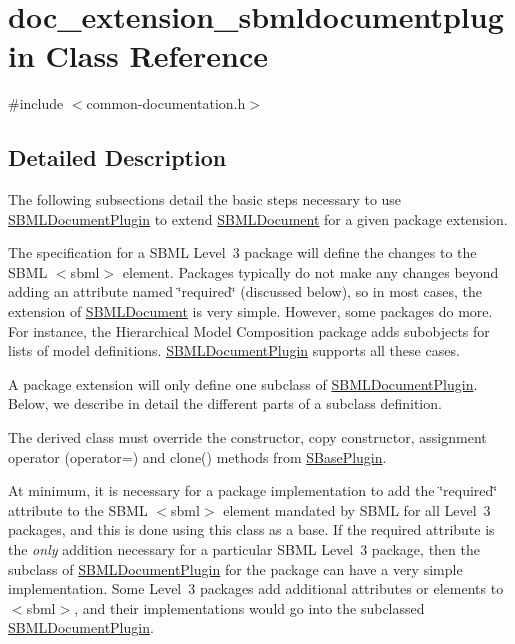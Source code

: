 \hypertarget{classdoc__extension__sbmldocumentplugin}{}\section{doc\+\_\+extension\+\_\+sbmldocumentplugin Class Reference}
\label{classdoc__extension__sbmldocumentplugin}


{\ttfamily \#include $<$common-\/documentation.\+h$>$}



\subsection{Detailed Description}
\begin{DoxyParagraph}{}
The following subsections detail the basic steps necessary to use \hyperlink{class_s_b_m_l_document_plugin}{S\+B\+M\+L\+Document\+Plugin} to extend \hyperlink{class_s_b_m_l_document}{S\+B\+M\+L\+Document} for a given package extension.
\end{DoxyParagraph}


The specification for a S\+B\+ML Level~3 package will define the changes to the S\+B\+ML {\ttfamily $<$sbml$>$} element. Packages typically do not make any changes beyond adding an attribute named \char`\"{}required\char`\"{} (discussed below), so in most cases, the extension of \hyperlink{class_s_b_m_l_document}{S\+B\+M\+L\+Document} is very simple. However, some packages do more. For instance, the Hierarchical Model Composition package adds subobjects for lists of model definitions. \hyperlink{class_s_b_m_l_document_plugin}{S\+B\+M\+L\+Document\+Plugin} supports all these cases.

A package extension will only define one subclass of \hyperlink{class_s_b_m_l_document_plugin}{S\+B\+M\+L\+Document\+Plugin}. Below, we describe in detail the different parts of a subclass definition.

The derived class must override the constructor, copy constructor, assignment operator ({\ttfamily operator=}) and {\ttfamily clone()} methods from \hyperlink{class_s_base_plugin}{S\+Base\+Plugin}.

At minimum, it is necessary for a package implementation to add the \char`\"{}required\char`\"{} attribute to the S\+B\+ML {\ttfamily $<$sbml$>$} element mandated by S\+B\+ML for all Level~3 packages, and this is done using this class as a base. If the \textquotesingle{}required\textquotesingle{} attribute is the {\itshape only} addition necessary for a particular S\+B\+ML Level~3 package, then the subclass of \hyperlink{class_s_b_m_l_document_plugin}{S\+B\+M\+L\+Document\+Plugin} for the package can have a very simple implementation. Some Level~3 packages add additional attributes or elements to {\ttfamily $<$sbml$>$}, and their implementations would go into the subclassed \hyperlink{class_s_b_m_l_document_plugin}{S\+B\+M\+L\+Document\+Plugin}.

